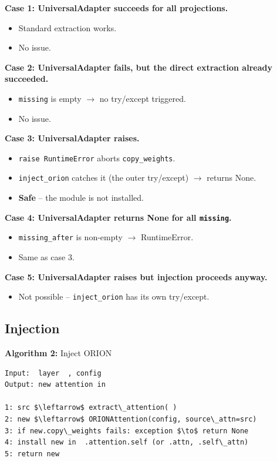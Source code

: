 \textbf{Case 1: UniversalAdapter succeeds for all projections.}
\begin{itemize}
\item Standard extraction works.
\item No issue.

\end{itemize}
\textbf{Case 2: UniversalAdapter fails, but the direct extraction already succeeded.}
\begin{itemize}
\item \texttt{missing} is empty $\to$ no try/except triggered.
\item No issue.

\end{itemize}
\textbf{Case 3: UniversalAdapter raises.}
\begin{itemize}
\item \texttt{raise RuntimeError} aborts \texttt{copy\_weights}.
\item \texttt{inject\_orion} catches it (the outer try/except) $\to$ returns None.
\item \textbf{Safe} -- the module is not installed.

\end{itemize}
\textbf{Case 4: UniversalAdapter returns None for all \texttt{missing}.}
\begin{itemize}
\item \texttt{missing\_after} is non-empty $\to$ RuntimeError.
\item Same as case 3.

\end{itemize}
\textbf{Case 5: UniversalAdapter raises but injection proceeds anyway.}
\begin{itemize}
\item Not possible -- \texttt{inject\_orion} has its own try/except.

\end{itemize}
\subsection{Injection}

\textbf{Algorithm 2:} Inject ORION
\begin{lstlisting}
Input:  layer  , config
Output: new attention in  

1: src $\leftarrow$ extract\_attention( )
2: new $\leftarrow$ ORIONAttention(config, source\_attn=src)
3: if new.copy\_weights fails: exception $\to$ return None
4: install new in  .attention.self (or .attn, .self\_attn)
5: return new
\end{lstlisting}

